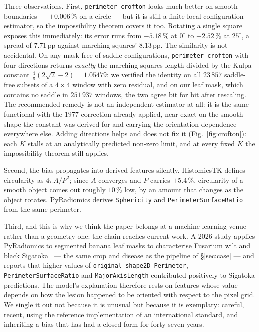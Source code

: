 \documentclass{article}
\newcommand{\pct}[1]{$#1\,\%$}
\begin{document}
Three observations. First, \texttt{perimeter\_crofton} looks much better on smooth
boundaries --- \pct{+0.006} on a circle --- but it is still a finite local-configuration
estimator, so the impossibility theorem covers it too. Rotating a single square exposes this
immediately: its error runs from \pct{-5.18} at $0^\circ$ to \pct{+2.52} at $25^\circ$, a spread
of $7.71$\,pp against marching squares' $8.13$\,pp. The similarity is not accidental. On
any mask free of saddle configurations, \texttt{perimeter\_crofton} with four directions returns
\emph{exactly} the marching-squares length divided by the Kulpa constant
$\tfrac{4}{\pi}(2\sqrt2-2) = 1.05479$: we verified the identity on all $23\,857$ saddle-free
subsets of a $4\times4$ window with zero residual, and on our leaf mask, which contains no saddle
in $251\,937$ windows, the two agree bit for bit after rescaling. The recommended remedy is not an
independent estimator at all: it is the same functional with the $1977$ correction already applied,
near-exact on the smooth shape the constant was derived for and carrying the orientation dependence
everywhere else. Adding directions helps and does not fix it (Fig.~\ref{fig:crofton}): each $K$ stalls at an
analytically predicted non-zero limit, and at every fixed $K$ the impossibility theorem still
applies.

Second, the bias propagates into derived features silently. HistomicsTK defines circularity as
$4\pi A/P^2$; since $A$ converges and $P$ carries \pct{+5.4}, circularity of a smooth object comes
out roughly \pct{10} low, by an amount that changes as the object rotates. PyRadiomics derives
\texttt{Sphericity} and \texttt{PerimeterSurfaceRatio} from the same perimeter.

Third, and this is why we think the paper belongs at a machine-learning venue rather than a geometry
one: the chain reaches current work. A 2026 study applies PyRadiomics to segmented banana leaf masks
to characterise Fusarium wilt and black Sigatoka~\citep{sigatoka2026} --- the same crop and disease
as the pipeline of \S\ref{sec:case} --- and reports that higher values of
\texttt{original\_shape2D\_Perimeter}, \texttt{PerimeterSurfaceRatio} and
\texttt{MajorAxisLength} contributed positively to Sigatoka predictions. The model's explanation
therefore rests on features whose value depends on how the lesion happened to be oriented with
respect to the pixel grid. We single it out not because it is unusual but because it is exemplary:
careful, recent, using the reference implementation of an international standard, and inheriting a
bias that has had a closed form for forty-seven years.
\end{document}
